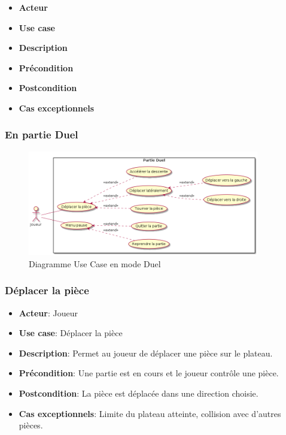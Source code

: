 \documentclass{article}
\begin{document}
\begin{itemize}
    \item \textbf{Acteur}
    \item \textbf{Use case}
    \item \textbf{Description}
    \item \textbf{Précondition}
    \item \textbf{Postcondition}
    \item \textbf{Cas exceptionnels}
\end{itemize}

\subsubsection*{En partie Duel}

\begin{figure}
    \centering
    \includegraphics[width=0.9\textwidth]{./uml/usescase/en-jeu/dual.png}
    \caption{Diagramme Use Case en mode Duel}
    \label{fig:Duel}
\end{figure}

\subsubsection*{Déplacer la pièce}
\begin{itemize}
    \item \textbf{Acteur}: Joueur
    \item \textbf{Use case}: Déplacer la pièce
    \item \textbf{Description}: Permet au joueur de déplacer une pièce sur le plateau.
    \item \textbf{Précondition}: Une partie est en cours et le joueur contrôle une pièce.
    \item \textbf{Postcondition}: La pièce est déplacée dans une direction choisie.
    \item \textbf{Cas exceptionnels}: Limite du plateau atteinte, collision avec d'autres pièces.
\end{itemize}
\end{document}

